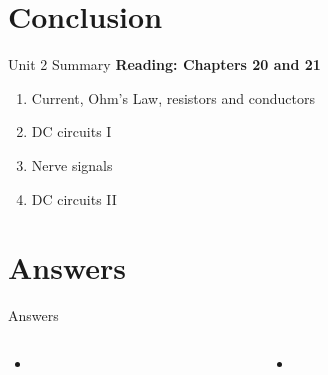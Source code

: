 \documentclass{beamer}
\begin{document}
\section{Conclusion}

\begin{frame}{Unit 2 Summary}
\textbf{Reading: Chapters 20 and 21}
\begin{enumerate}
\item Current, Ohm's Law, resistors and conductors
\item DC circuits I
\item Nerve signals
\item \alert{DC circuits II}
\end{enumerate}
\end{frame}

\section{Answers}

\begin{frame}{Answers}
\tiny
\begin{columns}[T]
\begin{column}{0.5\textwidth}
\begin{itemize}
\item 
\end{itemize}
\end{column}
\begin{column}{0.5\textwidth}
\begin{itemize}
\item 
\end{itemize}
\end{column}
\end{columns}
\end{frame}
\end{document}
